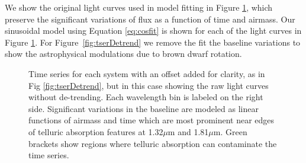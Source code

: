 \documentclass[twocolumn]{aastex6}
\begin{document}
We show the original light curves used in model fitting in Figure \ref{fig:tserNoDetrend}, which preserve the significant variations of flux as a function of time and airmass.
Our sinusoidal model using Equation \ref{eq:cosfit} is shown for each of the light curves in Figure \ref{fig:tserNoDetrend}.
For Figure~\ref{fig:tserDetrend} we remove the fit the baseline variations to show the astrophysical modulations due to brown dwarf rotation.

\begin{figure}[!t]
\centering
{}
	\caption{Time series for each system with an offset added for clarity, as in Fig \ref{fig:tserDetrend}, but in this case showing the raw light curves without de-trending.
	Each wavelength bin is labeled on the right side. Significant variations in the baseline are modeled as linear functions of airmass and time which are most prominent near edges of telluric absorption features at 1.32$\mu$m and 1.81$\mu$m.
	Green brackets show regions where telluric absorption can contaminate the time series.}
	\label{fig:tserNoDetrend}
\end{figure} 
\end{document}
